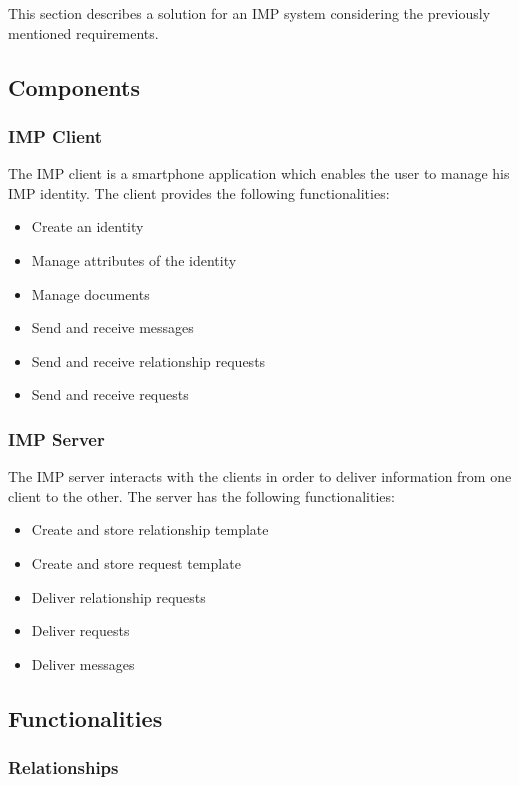\documentclass[
     12pt,         %
     a4paper,      %
     BCOR=10mm,version=first,     %
     DIV=14,version=first,        %
     ]{scrreprt}
\begin{document}
This section describes a solution for an IMP system considering the previously mentioned requirements.

\subsection{Components}

\subsubsection{IMP Client}

The IMP client is a smartphone application which enables the user to manage his IMP identity. The client provides the following functionalities:
\begin{itemize}
    \item Create an identity
    \item Manage attributes of the identity
    \item Manage documents
    \item Send and receive messages
    \item Send and receive relationship requests
    \item Send and receive requests
\end{itemize}

\subsubsection{IMP Server}
The IMP server interacts with the clients in order to deliver information from one client to the other. The server has the following functionalities:
\begin{itemize}
    \item Create and store relationship template
    \item Create and store request template
    \item Deliver relationship requests
    \item Deliver requests
    \item Deliver messages
\end{itemize}

\subsection{Functionalities}

\subsubsection{Relationships}
\end{document}
